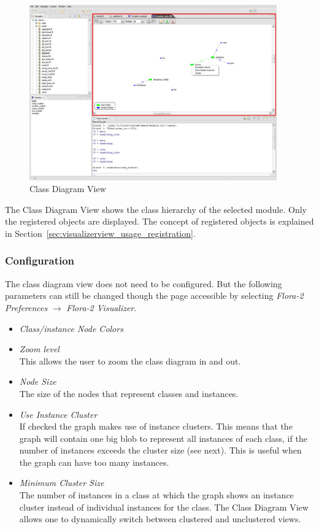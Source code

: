 \begin{figure}[tbh]
	\centering
		\includegraphics[width=0.95\textwidth]{fviz_viz}
	\caption{\FVIZ Class Diagram View}
	\label{fig:fviz_viz}
\end{figure}

The \FVIZ Class Diagram View shows the class hierarchy of the selected
\FLORA module. Only the registered objects are displayed. The concept of
registered objects is explained in
Section~\ref{sec:visualizerview_usage_registration}.

\subsubsection{Configuration}
\label{sec:visualizerview_configuration}

The class diagram view does not need to be configured. But the following
parameters can still be changed though the page accessible by selecting
\emph{Flora-2 Preferences}
$\rightarrow$ \emph{Flora-2 Visualizer}.
\begin{itemize}
\item \emph{Class/instance Node Colors}

\item \emph{Zoom level}  \\
  This allows the user to zoom the class diagram in and out.

\item \emph{Node Size}  \\
  The size of the nodes that represent classes and instances.

\item \emph{Use Instance Cluster}  \\
  If checked the graph makes use of instance clusters. This means that the
  graph will contain one big blob to represent all instances of each class,
  if the number of instances exceeds the cluster size (see next).
  This is useful when the graph can have too many instances.

\item \emph{Minimum Cluster Size}  \\
  The number of instances in a class
  at which the graph shows an instance cluster instead of
  individual instances for the class.
  The \FVIZ Class Diagram View allows one to
  dynamically switch between clustered and unclustered views.
\end{itemize}

